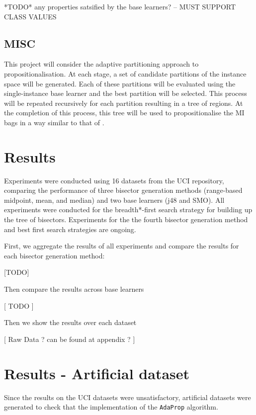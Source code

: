 \documentclass[a4paper,12pt]{article} %
\newcommand{\AdaProp}{\texttt{AdaProp}\xspace}
\begin{document}
*TODO* any properties satsified by the base learners?
-- MUST SUPPORT CLASS VALUES
    
\subsection{MISC}
This project will consider the adaptive partitioning approach to propositionalisation.
At each stage, a set of candidate partitions of the instance space will be generated. Each of these partitions will be evaluated using the  single-instance base learner and the best partition will be selected. This process will be repeated recursively for each partition resulting in a tree of regions. At the completion of this process, this tree will be used to propositionalise the MI bags in a way similar to that of .




\section{Results}
Experiments were conducted using 16 datasets from the UCI repository, 
    comparing the performance of three bisector generation methods 
    (range-based midpoint, mean, and median)
    and two base learners (j48 and SMO).
All experiments were conducted for the breadth*-first search strategy for 
    building up the tree of bisectors.
Experiments for the the fourth bisector generation method and best first search strategies 
    are ongoing.
    
First, we aggregate the results of all experiments and 
    compare the results for each bisector generation method:
    
[TODO]

Then compare the results across base learners 

[ TODO ]

Then we show the results over each dataset

[ Raw Data ? can be found at appendix ? ]    
    


\section{Results - Artificial dataset}
Since the results on the UCI datasets were unsatisfactory, 
    artificial datasets were generated to check that the 
    implementation of the \AdaProp algorithm.
    
\end{document}
